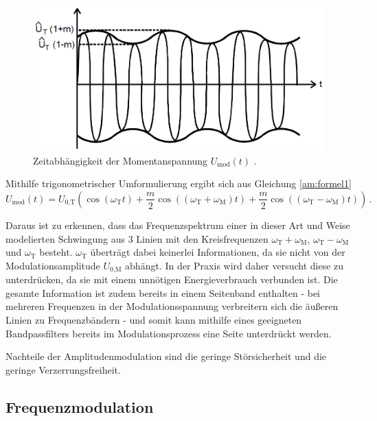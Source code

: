 \begin{figure}[!h]
    \centering
    \includegraphics[width=14cm]{images/am-amplitude.png}
    \caption{Zeitabhängigkeit der Momentanspannung $U_\text{mod}(t)$ \cite{V59}.}
    \label{am:amplitude}
\end{figure}

Mithilfe trigonometrischer Umformulierung ergibt sich aus Gleichung \eqref{am:formel1} 
\begin{equation}
     U_\text{mod}(t) = U_\text{0,T} \left( \cos{\left(\omega_\text{T} t\right)} + \frac{m}{2}\cos{\left((\omega_\text{T} + \omega_\text{M}) t\right)} + \frac{m}{2}\cos{\left((\omega_\text{T} - \omega_\text{M}) t\right)}\right) \,. \label{am:formel2}
\end{equation}

Daraus ist zu erkennen, dass das Frequenzspektrum einer in dieser Art und Weise modelierten Schwingung aus 3 Linien mit den Kreisfrequenzen $\omega_\text{T} + \omega_\text{M}$, $\omega_\text{T} - \omega_\text{M}$ und $\omega_\text{T}$ besteht.
$\omega_\text{T}$ überträgt dabei keinerlei Informationen, da sie nicht von der Modulationsamplitude $U_\text{0,M}$ abhängt.
In der Praxis wird daher versucht diese zu unterdrücken, da sie mit einem unnötigen Energieverbrauch verbunden ist.
Die gesamte Information ist zudem bereits in einem Seitenband enthalten - bei mehreren Frequenzen in der Modulationsspannung verbreitern sich die äußeren Linien zu Frequenzbändern - und somit kann mithilfe eines geeigneten Bandpassfilters bereits im Modulationsprozess eine Seite unterdrückt werden.

Nachteile der Amplitudenmodulation sind die geringe Störsicherheit und die geringe Verzerrungsfreiheit.

\subsection{Frequenzmodulation}
\label{subsec:einstein}

